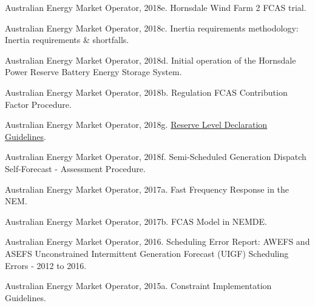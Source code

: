 \documentclass[12pt,a4paper,]{report}
\newlength{\cslhangindent}
\newenvironment{CSLReferences}[2] %
 {%
  \setlength{\parindent}{0pt}
  \ifodd #1 \everypar{\setlength{\hangindent}{\cslhangindent}}\ignorespaces\fi
  \ifnum #2 > 0
  \setlength{\parskip}{#2\baselineskip}
  \fi
 }%
 {}
\begin{document}
\begin{CSLReferences}{1}{0}
\leavevmode{}%
Australian Energy Market Operator, 2018e. Hornsdale {Wind Farm} 2 {FCAS}
trial.

\leavevmode{}%
Australian Energy Market Operator, 2018c. Inertia requirements
methodology: Inertia requirements \& shortfalls.

\leavevmode{}%
Australian Energy Market Operator, 2018d. Initial operation of the
{Hornsdale Power Reserve Battery Energy Storage System}.

\leavevmode{}%
Australian Energy Market Operator, 2018b. Regulation {FCAS Contribution
Factor Procedure}.

\leavevmode{}%
Australian Energy Market Operator, 2018g.
\href{https://www.aemo.com.au/-/media/files/electricity/nem/security_and_reliability/power_system_ops/reserve-level-declaration-guidelines.pdf?la=en}{Reserve
{Level Declaration Guidelines}}.

\leavevmode{}%
Australian Energy Market Operator, 2018f. Semi-{Scheduled Generation
Dispatch Self-Forecast} - {Assessment Procedure}.

\leavevmode{}%
Australian Energy Market Operator, 2017a. Fast {Frequency Response} in
the {NEM}.

\leavevmode{}%
Australian Energy Market Operator, 2017b. {FCAS Model} in {NEMDE}.

\leavevmode{}%
Australian Energy Market Operator, 2016. Scheduling {Error Report}:
{AWEFS} and {ASEFS Unconstrained Intermittent Generation Forecast}
({UIGF}) {Scheduling Errors} - 2012 to 2016.

\leavevmode{}%
Australian Energy Market Operator, 2015a. Constraint {Implementation
Guidelines}.


\end{CSLReferences}
\end{document}

